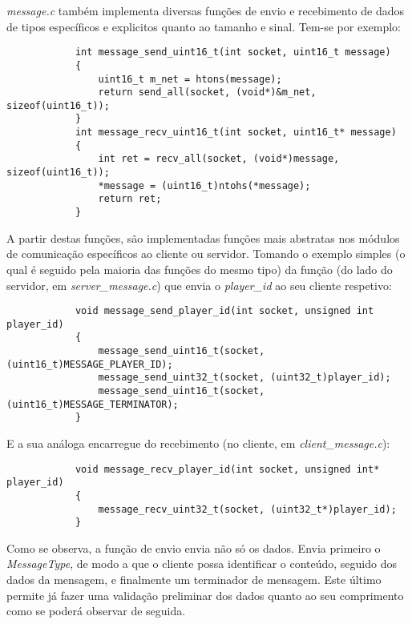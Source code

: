 \documentclass[a4paper]{report}
\begin{document}
        \par \textit{message.c} também implementa diversas funções de envio e recebimento de dados de tipos específicos e explicitos quanto ao tamanho e sinal. Tem-se por exemplo:
        \begin{lstlisting}
            int message_send_uint16_t(int socket, uint16_t message)
            {
                uint16_t m_net = htons(message);
                return send_all(socket, (void*)&m_net, sizeof(uint16_t));
            }
            int message_recv_uint16_t(int socket, uint16_t* message)
            {
                int ret = recv_all(socket, (void*)message, sizeof(uint16_t));
                *message = (uint16_t)ntohs(*message);
                return ret;
            }
        \end{lstlisting}

        \par A partir destas funções, são implementadas funções mais abstratas nos módulos de comunicação específicos ao cliente ou servidor. Tomando o exemplo simples (o qual é seguido pela maioria das funções do mesmo tipo) da função (do lado do servidor, em \textit{server\_message.c}) que envia o \textit{player\_id} ao seu cliente respetivo:
        \begin{lstlisting}
            void message_send_player_id(int socket, unsigned int player_id)
            {
                message_send_uint16_t(socket, (uint16_t)MESSAGE_PLAYER_ID);
                message_send_uint32_t(socket, (uint32_t)player_id);
                message_send_uint16_t(socket, (uint16_t)MESSAGE_TERMINATOR);
            }
        \end{lstlisting}
        \par E a sua análoga encarregue do recebimento (no cliente, em \textit{client\_message.c}):
        \begin{lstlisting}
            void message_recv_player_id(int socket, unsigned int* player_id)
            {
                message_recv_uint32_t(socket, (uint32_t*)player_id);
            }
        \end{lstlisting}
        \par Como se observa, a função de envio envia não só os dados. Envia primeiro o \textit{MessageType}, de modo a que o cliente possa identificar o conteúdo, seguido dos dados da mensagem, e finalmente um terminador de mensagem. Este último permite já fazer uma validação preliminar dos dados quanto ao seu comprimento como se poderá observar de seguida.
        
\end{document}
